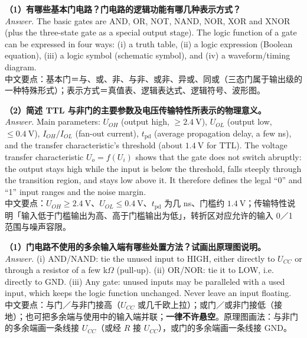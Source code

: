 \documentclass[11pt]{ctexart}
\let\orighdr\hdr
\renewcommand{\hdr}[2]{\needspace{10\baselineskip}\orighdr{#1}{#2}}
\let\origsubhdr\subhdr
\renewcommand{\subhdr}[1]{\needspace{3\baselineskip}\origsubhdr{#1}}
\begin{document}



\textbf{（1）有哪些基本门电路？门电路的逻辑功能有哪几种表示方式？}\\
\emph{Answer.} The basic gates are AND, OR, NOT, NAND, NOR, XOR and XNOR (plus the three-state gate as a special output stage). The logic function of a gate can be expressed in four ways: (i) a truth table, (ii) a logic expression (Boolean equation), (iii) a logic symbol (schematic symbol), and (iv) a waveform/timing diagram.\\
中文要点：基本门＝与、或、非、与非、或非、异或、同或（三态门属于输出级的一种特殊形式）；表示方式＝真值表、逻辑表达式、逻辑符号、波形图。

\textbf{（2）简述 TTL 与非门的主要参数及电压传输特性所表示的物理意义。}\\
\emph{Answer.} Main parameters: $U_{OH}$ (output high, $\ge2.4\ \mathrm{V}$), $U_{OL}$ (output low, $\le0.4\ \mathrm{V}$), $I_{OH}/I_{OL}$ (fan-out current), $t_{\mathrm{pd}}$ (average propagation delay, a few ns), and the transfer characteristic's threshold (about $1.4\ \mathrm{V}$ for TTL). The voltage transfer characteristic $U_o=f(U_i)$ shows that the gate does not switch abruptly: the output stays high while the input is below the threshold, falls steeply through the transition region, and stays low above it. It therefore defines the legal ``0'' and ``1'' input ranges and the noise margin.\\
中文要点：$U_{OH}\ge2.4\ \mathrm{V}$、$U_{OL}\le0.4\ \mathrm{V}$、$t_{\mathrm{pd}}$ 为几 ns、门槛约 $1.4\ \mathrm{V}$；传输特性说明「输入低于门槛输出为高、高于门槛输出为低」，转折区对应允许的输入 0／1 范围与噪声容限。


\textbf{（1）门电路不使用的多余输入端有哪些处置方法？试画出原理图说明。}\\
\emph{Answer.} (i) AND/NAND: tie the unused input to HIGH, either directly to $U_{CC}$ or through a resistor of a few k$\Omega$ (pull-up). (ii) OR/NOR: tie it to LOW, i.e. directly to GND. (iii) Any gate: unused inputs may be paralleled with a used input, which keeps the logic function unchanged. Never leave an input floating.\\
中文要点：与门／与非门接高（$U_{CC}$ 或几千欧上拉）；或门／或非门接低（接地）；也可把多余端与使用中的输入端并联；\textbf{一律不许悬空}。原理图画法：与非门的多余端画一条线接 $U_{CC}$（或经 $R$ 接 $U_{CC}$），或门的多余端画一条线接 GND。
\end{document}
